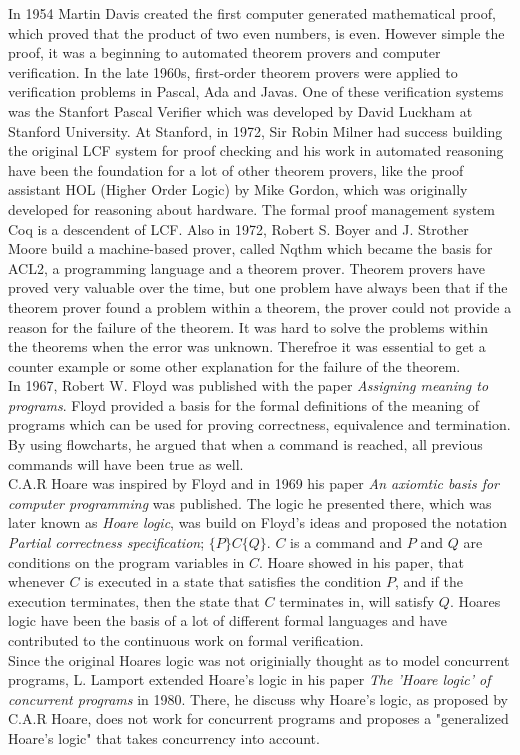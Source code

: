 In 1954 Martin Davis created the first computer generated mathematical proof, which proved that the product of two even numbers, is even. However simple the proof, it was a beginning to automated theorem provers and computer verification.
In the late 1960s, first-order theorem provers were applied to verification problems in Pascal, Ada and Javas. One of these verification systems was the Stanfort Pascal Verifier\cite{Verifier1979} which was developed by David Luckham at Stanford University.
At Stanford, in 1972, Sir Robin Milner had success building the original LCF system for proof checking and his work in automated reasoning have been the foundation for a lot of other theorem provers, like the proof assistant HOL (Higher Order Logic) by Mike Gordon, which was originally developed for reasoning about hardware. The formal proof management system Coq %
is a descendent of LCF.
Also in 1972, Robert S. Boyer and J. Strother Moore build a machine-based prover, called Nqthm which became the basis for ACL2, a programming language and a theorem prover. Theorem provers have proved very valuable over the time, but one problem have always been that if the theorem prover found a problem within a theorem, the prover could not provide a reason for the failure of the theorem. It was hard to solve the problems within the theorems when the error was unknown. Therefroe it was essential to get a counter example or some other explanation for the failure of the theorem. \\

In 1967, Robert W. Floyd was published with the paper \textit{Assigning meaning to programs}\cite{Floyd1967}. Floyd provided a basis for the formal definitions of the meaning of programs which can be used for proving correctness, equivalence and termination. By using flowcharts, he argued that when a command is reached, all previous commands will have been true as well.\\ C.A.R Hoare was inspired by Floyd and in 1969 his paper \textit{An axiomtic basis for computer programming}\cite{Hoare1969} was published. The logic he presented there, which was later known as \textit{Hoare logic}, was build on Floyd's ideas and proposed the notation \textit{Partial correctness specification}; $\{P\} C \{Q\}$. $C$ is a command and $P$ and $Q$ are conditions on the program variables in $C$. Hoare showed in his paper, that whenever $C$ is executed in a state that satisfies the condition $P$, and if the execution terminates, then the state that $C$ terminates in, will satisfy $Q$. Hoares logic have been the basis of a lot of different formal languages and have contributed to the continuous work on formal verification. \\
Since the original Hoares logic was not originially thought as to model concurrent programs, L. Lamport extended Hoare's logic in his paper \textit{The 'Hoare logic' of concurrent programs}\cite{Lamport1980} in 1980. There, he discuss why Hoare's logic, as proposed by C.A.R Hoare, does not work for concurrent programs and proposes a "generalized Hoare's logic" that takes concurrency into account. \\

